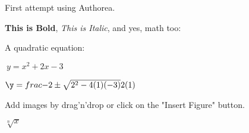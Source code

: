 First attempt using Authorea.

\textbf{This is Bold}, \textit{This is Italic}, and yes, math too:

A quadratic equation:

$\ y = x^{2} + 2x -3 $

$\y = frac{-2 \pm \sqrt{2^{2}-4(1)(-3)}}{2(1)}$


Add images by drag'n'drop or click on the "Insert Figure" button.

$\sqrt[n]{x}$